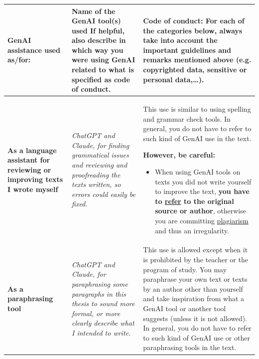 \begin{longtable}{|p{}|p{}|p{}|}
\hline 
\textbf{GenAI assistance used as/for:} & \textbf{Name of the GenAI tool(s) used} If helpful, also describe in which way you were using GenAI related to what is specified as code of conduct. & \textbf{Code of conduct: \newline
For each of the categories below, always take into account the important guidelines and remarks mentioned above (e.g. copyrighted data, sensitive or personal data,…).} \\ \hline
\endfirsthead


\hline
\endfoot

\hline
\endlastfoot

\textbf{As a language assistant for reviewing or improving texts I wrote myself} & \textit{ChatGPT and Claude, for finding grammatical issues and reviewing and proofreading the texts written, so errors could easily be fixed.} & This use is similar to using spelling and grammar check tools. In general, you do not have to refer to such kind of GenAI use in the text. 

\textbf{However, be careful: }
\begin{itemize}
    \item When using GenAI tools on texts you did not write yourself to improve the text, \textbf{you have to \href{https://bib.kuleuven.be/english/training-and-tutorials/citation}{refer} to the original source or author}, otherwise you are committing \href{https://www.kuleuven.be/english/education/plagiarism/index}{plagiarism} and thus an irregularity.
\end{itemize} \\ \hline
\textbf{As a paraphrasing tool} & \textit{ChatGPT and Claude, for paraphrasing some paragraphs in this thesis to sound more formal, or more clearly describe what I intended to write.} & This use is allowed except when it is prohibited by the teacher or the program of study. You may paraphrase your own text or texts by an author other than yourself and take inspiration from what a GenAI tool or another tool suggests (unless it is not allowed). In general, you do not have to refer to such kind of GenAI use or other paraphrasing tools in the text. 


\end{longtable}

